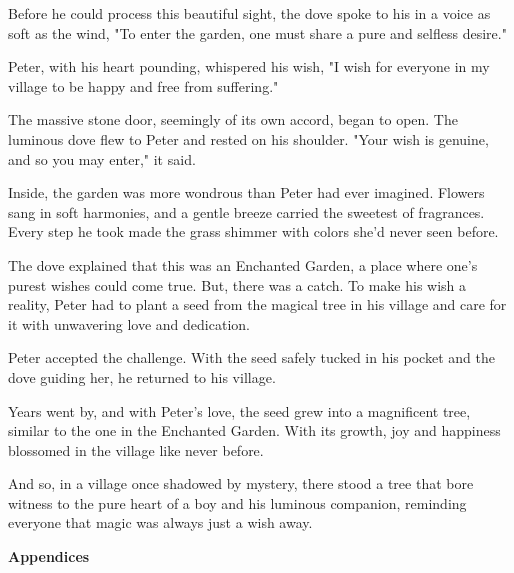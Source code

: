 \documentclass[12pt]{article}
\begin{document}
Before he could process this beautiful sight, the dove spoke to his in a voice as soft as the wind, "To enter the garden, one must share a pure and selfless desire."

Peter, with his heart pounding, whispered his wish, "I wish for everyone in my village to be happy and free from suffering."

The massive stone door, seemingly of its own accord, began to open. The luminous dove flew to Peter and rested on his shoulder. "Your wish is genuine, and so you may enter," it said.

Inside, the garden was more wondrous than Peter had ever imagined. Flowers sang in soft harmonies, and a gentle breeze carried the sweetest of fragrances. Every step he took made the grass shimmer with colors she'd never seen before.

The dove explained that this was an Enchanted Garden, a place where one’s purest wishes could come true. But, there was a catch. To make his wish a reality, Peter had to plant a seed from the magical tree in his village and care for it with unwavering love and dedication.

Peter accepted the challenge. With the seed safely tucked in his pocket and the dove guiding her, he returned to his village.

Years went by, and with Peter's love, the seed grew into a magnificent tree, similar to the one in the Enchanted Garden. With its growth, joy and happiness blossomed in the village like never before.

And so, in a village once shadowed by mystery, there stood a tree that bore witness to the pure heart of a boy and his luminous companion, reminding everyone that magic was always just a wish away.


\newpage




\newpage

\pagestyle{fancyplain}
\vspace*{\fill}
     \begin{center}
          \bf{\Huge{Appendices}}
     \end{center}
\vspace*{\fill}
\thispagestyle{fancy}

\makeatletter
\def\@makechapterhead#1{%
  \vspace*{30\p@}%
  {\noindent\LARGE\bf APPENDIX\ \thechapter \hspace*{0.5cm} \parindent \z@ \raggedright \normalfont
    \interlinepenalty\@M
    \LARGE \bfseries #1\par\nobreak
    \vskip 30\p@
  }}
  \makeatother

  
\appendix
\thispagestyle{empty}
\end{document}
